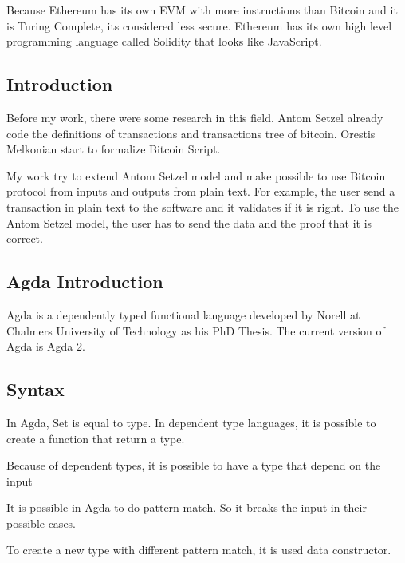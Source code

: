 \documentclass[12pt]{article}
\begin{document}
Because Ethereum has its own EVM with more instructions than Bitcoin and it is Turing Complete,
its considered less secure.
Ethereum has its own high level programming language called Solidity that looks like JavaScript.

\subsection{Introduction}

Before my work, there were some research in this field.
Antom Setzel \cite{setzer2018modelling} already code the definitions of transactions and transactions tree of bitcoin.
Orestis Melkonian start to formalize Bitcoin Script.

My work try to extend Antom Setzel model and make possible to use Bitcoin protocol
from inputs and outputs from plain text.
For example, the user send a transaction in plain text to the software and it validates if it is right.
To use the Antom Setzel model, the user has to send the data and the proof that it is correct.

\subsection{Agda Introduction}
Agda is a dependently typed functional language developed by Norell at Chalmers University of Technology as his PhD Thesis.
The current version of Agda is Agda 2.

  \subsection{Syntax}
  In Agda, Set is equal to type.
  In dependent type languages, it is possible to create a function that return a type.


  Because of dependent types, it is possible to have a type that depend on the input


  It is possible in Agda to do pattern match.
  So it breaks the input in their possible cases.


  To create a new type with different pattern match, it is used data constructor.

\end{document}
